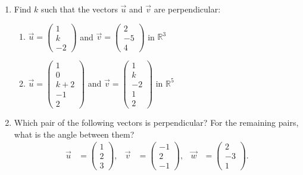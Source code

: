 \documentclass[a4paper,11pt]{article}
\begin{document}
\begin{enumerate}[label=3.\arabic*]
    \item Find $k$ such that the vectors $\vec{u}$ and $\vec{v}$ are perpendicular:
    \begin{enumerate}
        \item $\vec{u} = \begin{pmatrix} 1 \\ k \\ -2 \end{pmatrix}$ and $\vec{v} = \begin{pmatrix} 2 \\ -5 \\ 4 \end{pmatrix}$ in $\mathbb{R}^3$

        \item $\vec{u} = \begin{pmatrix} 1 \\ 0 \\ k + 2 \\ -1 \\ 2 \end{pmatrix}$ and $\vec{v} = \begin{pmatrix} 1 \\ k \\ -2 \\ 1 \\ 2 \end{pmatrix}$ in $\mathbb{R}^5$
    \end{enumerate}

    \item Which pair of the following vectors is perpendicular? For the remaining pairs, what is the angle between them?
    \begin{align*}
        \vec{u} &= \begin{pmatrix} 1 \\ 2 \\ 3 \end{pmatrix}, &
        \vec{v} &= \begin{pmatrix} -1 \\ 2 \\ -1 \end{pmatrix}, &
        \vec{w} &= \begin{pmatrix} 2 \\ -3 \\ 1 \end{pmatrix}.
    \end{align*}
\end{enumerate}
\end{document}
